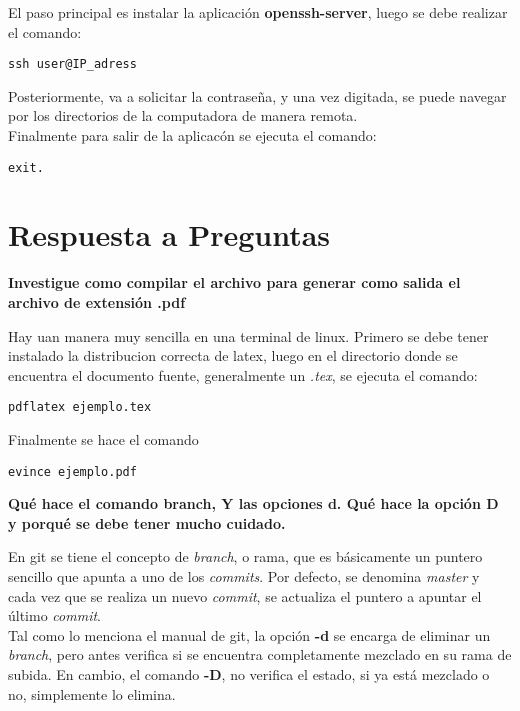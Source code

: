 \documentclass{article}
\begin{document}
\bigskip

El paso principal es instalar la aplicaci\' on \textbf{openssh-server}, luego se debe realizar el comando:
\begin{verbatim}
ssh user@IP_adress
\end{verbatim}
Posteriormente, va a solicitar la contrase\~ na, y una vez digitada, se puede navegar por los directorios de la computadora de manera remota. \\
Finalmente para salir de la aplicac\' on se ejecuta el comando:
\begin{verbatim}
exit.
\end{verbatim}

\section{Respuesta a Preguntas}
\textbf{Investigue como compilar el archivo para generar como salida el archivo de extensi\' on .pdf}

Hay uan manera muy sencilla en una terminal de linux. Primero se debe tener instalado la distribucion correcta de latex, luego en el directorio donde se encuentra el documento fuente, generalmente un \textit{.tex}, se ejecuta el comando: 

\begin{verbatim}
pdflatex ejemplo.tex
\end{verbatim}

Finalmente se hace el comando

\begin{verbatim}
evince ejemplo.pdf
\end{verbatim}

\textbf{Qu\' e hace el comando branch, Y las opciones d. Qu\' e hace la opci\' on D y porqu\' e se debe tener mucho cuidado.}

En git se tiene el concepto de \textit{branch}, o rama, que es b\' asicamente un puntero sencillo que apunta a uno de los \textit{commits}. 
Por defecto, se denomina \textit{master} y cada vez que se realiza un nuevo \textit{commit}, se actualiza el puntero a apuntar el \' ultimo \textit{commit}.\\

Tal como lo menciona el manual de git, la opci\' on \textbf{-d} se encarga de 
eliminar un \textit{branch}, pero antes verifica si se encuentra completamente mezclado en su rama de subida. En cambio, el comando \textbf{-D}, no verifica el estado, si ya est\' a mezclado o no, simplemente lo elimina.\\
\end{document}
